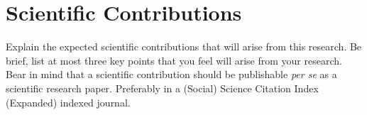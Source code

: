 \section{Scientific Contributions}
Explain the expected scientific contributions that will arise from this research. Be brief, list at most three key points that you feel will arise from your research. Bear in mind that a scientific contribution should be publishable \emph{per se} as a scientific research paper. Preferably in a (Social) Science Citation Index (Expanded) indexed journal.
